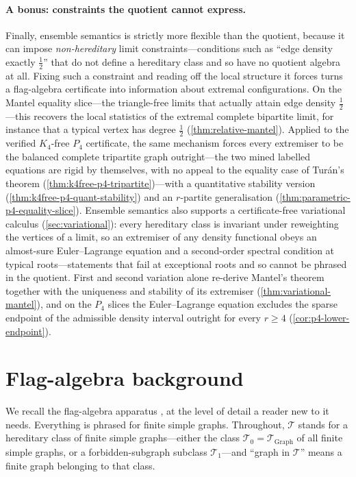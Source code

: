 \documentclass[11pt]{article}
\theoremstyle{definition}
\newcommand{\T}{\mathcal{T}}
\begin{document}
\paragraph{A bonus: constraints the quotient cannot express.}
Finally, ensemble semantics is strictly more flexible than the quotient, because it can
impose \emph{non-hereditary} limit constraints---conditions such as ``edge density exactly
$\tfrac12$'' that do not define a hereditary class and so have no quotient algebra at all.
Fixing such a constraint and reading off the local structure it forces turns a
flag-algebra certificate into information about extremal configurations.  On the Mantel
equality slice---the triangle-free limits that actually attain edge density
$\tfrac12$---this recovers the local statistics of the extremal complete bipartite
limit, for instance that a typical vertex has degree $\tfrac12$ (\cref{thm:relative-mantel}).
Applied to the verified $K_4$-free $P_4$ certificate, the same mechanism forces every
extremiser to be the balanced complete tripartite graph outright---the two mined
labelled equations are rigid by themselves, with no appeal to the equality case of
Tur\'an's theorem (\cref{thm:k4free-p4-tripartite})---with a quantitative stability
version (\cref{thm:k4free-p4-quant-stability}) and an
$r$-partite generalisation (\cref{thm:parametric-p4-equality-slice}).  Ensemble
semantics also supports a certificate-free variational calculus
(\cref{sec:variational}): every hereditary class is invariant under reweighting the
vertices of a limit, so an extremiser of any density functional obeys an almost-sure
Euler--Lagrange equation and a second-order spectral condition at typical
roots---statements that fail at exceptional roots and so cannot be phrased in the
quotient.  First and second variation alone re-derive Mantel's theorem together with
the uniqueness and stability of its extremiser (\cref{thm:variational-mantel}), and on
the $P_4$ slices the Euler--Lagrange equation excludes the sparse endpoint of the
admissible density interval outright for every $r\ge4$
(\cref{cor:p4-lower-endpoint}).

\section{Flag-algebra background}\label{sec:background}

We recall the flag-algebra apparatus \cite{Razborov2007}, at the level of detail a reader
new to it needs.  Everything is phrased for finite simple graphs.  Throughout, $\T$ stands
for a hereditary class of finite simple graphs---either the class
$\T_0=\T_{\mathrm{Graph}}$ of all finite simple graphs, or a forbidden-subgraph subclass
$\T_1$---and ``graph in $\T$'' means a finite graph belonging to that class.
\end{document}
